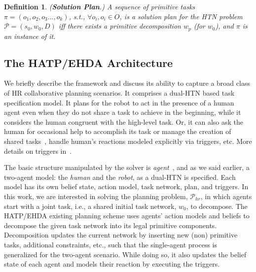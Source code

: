 \documentclass[letterpaper]{article} %
\newtheorem{definition}{Definition}
\begin{document}
\begin{definition} \label{def:htn-sol-plan}
(\textbf{Solution Plan}.) 
{A sequence of primitive tasks $\pi=(o_1,o_2,o_3...,o_k)$, s.t., $\forall o_i, o_i \in O$, is a solution plan for the HTN problem $\mathcal{P}=(s_0,w_0,D)$ iff there exists a primitive decomposition $w_p$ (for $w_0$), and $\pi$ is an instance of it. 
}  
\end{definition}

\subsection{The HATP/EHDA Architecture}
We briefly describe the framework and discuss its ability to capture a broad class of HR collaborative planning scenarios. 
It comprises a dual-HTN based task specification model. It plans for the robot to act in the presence of a human agent even when they do not share a task to achieve in the beginning, while it considers the human congruent with the high-level task. 
Or, it can also ask the human for occasional help to accomplish its task or manage the creation of shared tasks~\cite{buisan:hal-03684211}, handle human's reactions modeled explicitly via triggers, etc. More details on triggers  in~\cite{ingrand1996prs,AlamiCFGI98}.  

The basic structure manipulated by the solver is \textit{agent}~\cite{thesisBuisan21}, and as we said earlier, a two-agent model: the \textit{human} and the \textit{robot}, as a dual-HTN is specified. 
Each model has its own belief state, action model, task network, plan, and triggers. In this work, we are interested in solving the planning problem, $\mathcal{P}_{hr}$, in which agents start with a joint task, i.e., a shared initial task network, $w_0$, to decompose.
The HATP/EHDA existing planning scheme uses agents' action models and beliefs to decompose the given task network into its legal primitive components. 
Decomposition updates the current network by inserting new (non) primitive tasks, additional constraints, etc., such that the single-agent process is generalized for the two-agent scenario.
While doing so, it also updates the belief state of each agent and models their reaction by executing the triggers.
\end{document}
